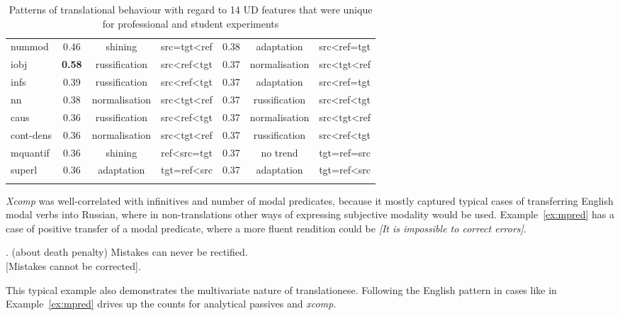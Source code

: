 \begin{longtable}[H]{p{1.84cm}|ccc||ccc}
	nummod        & 0.46 & shining       & src=tgt\textless{}ref           & 0.38 & adaptation    & src\textless{}ref=tgt           \\
	iobj          & \textbf{0.58} & russification & src\textless{}ref\textless{}tgt & 0.37 & normalisation & src\textless{}tgt\textless{}ref \\
	infs          & 0.39 & russification & src\textless{}ref\textless{}tgt & 0.37 & adaptation    & src\textless{}ref=tgt           \\
	nn            & 0.38 & normalisation & src\textless{}tgt\textless{}ref & 0.37 & russification & src\textless{}ref\textless{}tgt \\
	caus          & 0.36 & russification & src\textless{}ref\textless{}tgt & 0.37 & normalisation & src\textless{}tgt\textless{}ref \\
	cont-dens & 0.36 & normalisation & src\textless{}tgt\textless{}ref & 0.37 & russification & src\textless{}ref\textless{}tgt \\
	mquantif      & 0.36 & shining       & ref\textless{}src=tgt           & 0.37 & no trend       & tgt=ref=src                     \\
	superl        & 0.36 & adaptation    & tgt=ref\textless{}src           & 0.37 & adaptation    & tgt=ref\textless{}src  \\
	\bottomrule
	\caption{\label{tab:spec_rfecv_feats}Patterns of translational behaviour with regard to 14 UD features that were unique for professional and student experiments}\\
\end{longtable}	

\textit{Xcomp} was well-correlated with infinitives and number of modal predicates, because it mostly captured typical cases of transferring English modal verbs into Russian, where in non-translations other ways of expressing subjective modality would be used. Example~\ref{ex:mpred} has a case of positive transfer of a modal predicate, where a more fluent rendition could be  \textit{[It is impossible to correct errors]}. 

\ex. \label{ex:mpred}\hspace{1pt}
(about death penalty) Mistakes can never be rectified.\\
 [Mistakes cannot be corrected].

This typical example also demonstrates the multivariate nature of translationese. Following the English pattern in cases like in Example~\ref{ex:mpred} drives up the counts for analytical passives and \textit{xcomp}.


